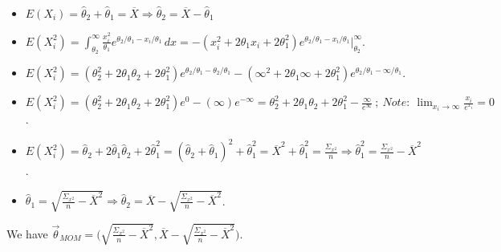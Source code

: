 \documentclass[12pt]{article}
\newcommand{\ds}{\displaystyle}
\begin{document}
\begin{itemize}
    \item $ \ds E( X_{i} ) = \hat{\theta}_{2} + \hat{\theta}_{1} = \overline{X} \Rightarrow \hat{\theta}_{2} = \overline{X} - \hat{\theta}_{1} $
    \item $ \ds E( X_{i}^{2} ) = \int_{\theta_{2}}^{\infty} \frac{x_{i}^{2}}{\theta_{1}}e^{\theta_{2} / \theta_{1} - x_{i} / \theta_{1}} \,dx = -(x_{i}^{2} + 2\theta_{1}x_{i} + 2\theta_{1}^{2}) e^{\theta_{2} / \theta_{1} - x_{i} / \theta_{1}} \Big|_{\theta_2}^{\infty} $.
    \item $ \ds E( X_{i}^{2} ) = (\theta_{2}^{2} + 2\theta_{1}\theta_{2} + 2\theta_{1}^{2}) e^{\theta_{2} / \theta_{1} - \theta_{2} / \theta_{1}} -(\infty^{2} + 2\theta_{1}\infty + 2\theta_{1}^{2}) e^{\theta_{2} / \theta_{1} - \infty / \theta_{1}} $.
    \item $ \ds E( X_{i}^{2} ) = (\theta_{2}^{2} + 2\theta_{1}\theta_{2} + 2\theta_{1}^{2}) e^{0} -(\infty) e^{-\infty} = \theta_{2}^{2} + 2\theta_{1}\theta_{2} + 2\theta_{1}^{2} - \frac{\infty}{e^{\infty}} \ ; \ Note: \ \lim_{x_{i} \to \infty} \frac{x_{i}}{e^{x_{i}}} = 0 $.
    \item $ \ds E( X_{i}^{2} ) = \hat{\theta}_{2} + 2\hat{\theta}_{1}\hat{\theta}_{2} + 2\hat{\theta}_{1}^{2} = (\hat{\theta}_{2} + \hat{\theta}_{1})^{2} + \hat{\theta}_{1}^{2} = \overline{X}^{2} + \hat{\theta}_{1}^{2} = \frac{\Sigma_{x^{2}}}{n} \Rightarrow \hat{\theta}_{1}^{2} = \frac{\Sigma_{x^{2}}}{n} - \overline{X}^{2} $.
    \item $ \ds \hat{\theta}_{1} = \sqrt{\frac{\Sigma_{x^{2}}}{n} - \overline{X}^{2}} \Rightarrow \hat{\theta}_{2} = \overline{X} - \sqrt{\frac{\Sigma_{x^{2}}}{n} - \overline{X}^{2}} $.
\end{itemize}

We have $ \ds \overrightarrow{\theta}_{MOM} = \Biggl( \sqrt{\frac{\Sigma_{x^{2}}}{n} - \overline{X}^{2}}, \overline{X} - \sqrt{\frac{\Sigma_{x^{2}}}{n} - \overline{X}^{2}} \Biggr) $.
\end{document}
